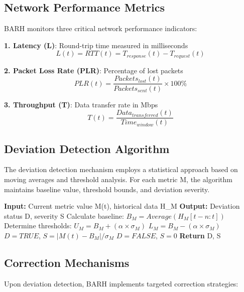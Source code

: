 \documentclass[conference]{IEEEtran}
\begin{document}
\subsection{Network Performance Metrics}

BARH monitors three critical network performance indicators:

\textbf{1. Latency (L)}: Round-trip time measured in milliseconds
\begin{equation}
L(t) = RTT(t) = T_{response}(t) - T_{request}(t)
\end{equation}

\textbf{2. Packet Loss Rate (PLR)}: Percentage of lost packets
\begin{equation}
PLR(t) = \frac{Packets_{lost}(t)}{Packets_{sent}(t)} \times 100\%
\end{equation}

\textbf{3. Throughput (T)}: Data transfer rate in Mbps
\begin{equation}
T(t) = \frac{Data_{transferred}(t)}{Time_{window}(t)}
\end{equation}

\subsection{Deviation Detection Algorithm}

The deviation detection mechanism employs a statistical approach based on moving averages and threshold analysis. For each metric M, the algorithm maintains baseline value, threshold bounds, and deviation severity.

\begin{algorithmic}
\STATE \textbf{Input:} Current metric value M(t), historical data H_M
\STATE \textbf{Output:} Deviation status D, severity S
\STATE Calculate baseline: $B_M = Average(H_M[t-n:t])$
\STATE Determine thresholds: $U_M = B_M + (\alpha \times \sigma_M)$
\STATE $L_M = B_M - (\alpha \times \sigma_M)$
    \STATE $D = TRUE$, $S = |M(t) - B_M| / \sigma_M$
\ELSE
    \STATE $D = FALSE$, $S = 0$
\ENDIF
\STATE \textbf{Return} D, S
\end{algorithmic}

\subsection{Correction Mechanisms}

Upon deviation detection, BARH implements targeted correction strategies:
\end{document}
